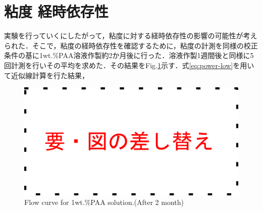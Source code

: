 \section{粘度 経時依存性}

実験を行っていくにしたがって，粘度に対する経時依存性の影響の可能性が考えられた．そこで，粘度の経時依存性を確認するために，粘度の計測を同様の校正条件の基に1wt.\%PAA溶液作製約2か月後に行った．溶液作製1週間後と同様に5回計測を行いその平均を求めた．その結果をFig.\ref{fig:PAA-vis-2}示す．式\ref{eq:power-low}を用いて近似線計算を行た結果，

\begin{figure}[ht]
    \centering
    \includegraphics[width=12cm,clip]{tmp.png}
    \caption{Flow curve for 1wt.\%PAA solution.(After 2 month)}
    \label{fig:PAA-vis-2}
\end{figure}